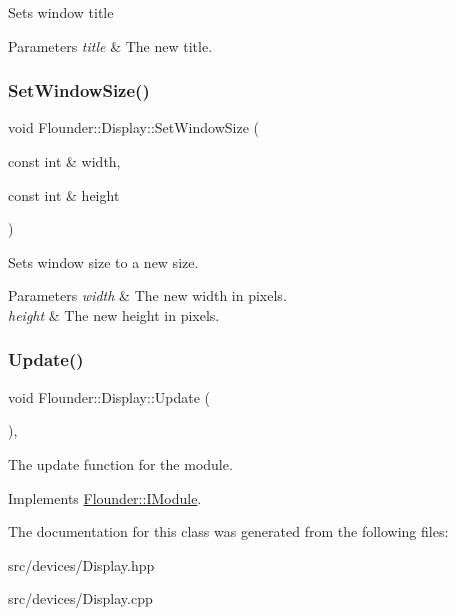 Sets window title 


\begin{DoxyParams}{Parameters}
{\em title} & The new title. \\
\hline
\end{DoxyParams}
\mbox{\label{class_flounder_1_1_display_a8f95a2ad9ebedac32b1f95d76b6f265d}} 
\subsubsection{\texorpdfstring{Set\+Window\+Size()}{SetWindowSize()}}
{\footnotesize\ttfamily void Flounder\+::\+Display\+::\+Set\+Window\+Size (\begin{DoxyParamCaption}\item[{const int \&}]{width,  }\item[{const int \&}]{height }\end{DoxyParamCaption})}



Sets window size to a new size. 


\begin{DoxyParams}{Parameters}
{\em width} & The new width in pixels. \\
\hline
{\em height} & The new height in pixels. \\
\hline
\end{DoxyParams}
\mbox{\label{class_flounder_1_1_display_a1432d6de0e572b36116db97d3aeee1e5}} 
\subsubsection{\texorpdfstring{Update()}{Update()}}
{\footnotesize\ttfamily void Flounder\+::\+Display\+::\+Update (\begin{DoxyParamCaption}{ }\end{DoxyParamCaption})\hspace{0.3cm}{\ttfamily [override]}, {\ttfamily [virtual]}}



The update function for the module. 



Implements \hyperlink{class_flounder_1_1_i_module_a1812bb03a6990e4698a10c043fa25fde}{Flounder\+::\+I\+Module}.



The documentation for this class was generated from the following files\+:\begin{DoxyCompactItemize}
\item 
src/devices/Display.\+hpp\item 
src/devices/Display.\+cpp\end{DoxyCompactItemize}
